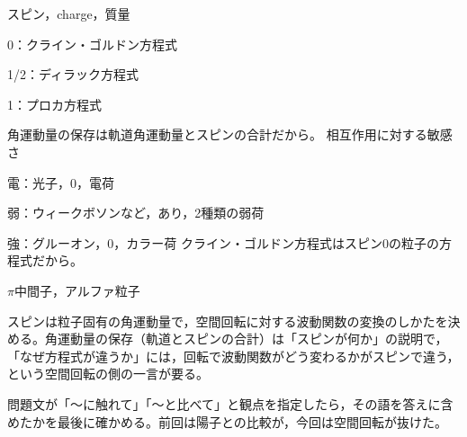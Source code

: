 スピン，charge，質量

0：クライン・ゴルドン方程式

1/2：ディラック方程式

1：プロカ方程式

角運動量の保存は軌道角運動量とスピンの合計だから。
相互作用に対する敏感さ

電：光子，0，電荷

弱：ウィークボソンなど，あり，2種類の弱荷

強：グルーオン，0，カラー荷
クライン・ゴルドン方程式はスピン0の粒子の方程式だから。

$\pi$中間子，アルファ粒子
\item スピンは粒子固有の角運動量で，空間回転に対する波動関数の変換のしかたを決める。角運動量の保存（軌道とスピンの合計）は「スピンが何か」の説明で，「なぜ方程式が違うか」には，回転で波動関数がどう変わるかがスピンで違う，という空間回転の側の一言が要る。
\item {} 問題文が「〜に触れて」「〜と比べて」と観点を指定したら，その語を答えに含めたかを最後に確かめる。前回は陽子との比較が，今回は空間回転が抜けた。
